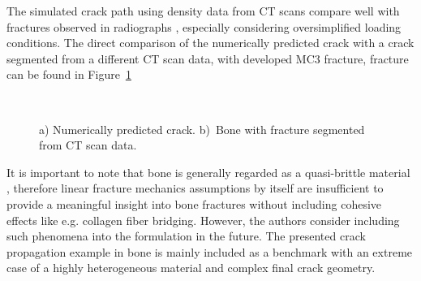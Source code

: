 \documentclass[onecolumn]{svjour3}
\begin{document}
The simulated crack path using density data from CT scans compare well with fractures observed in radiographs \cite{whitton2010third}, especially considering oversimplified loading conditions. The direct comparison of the numerically predicted crack with a crack segmented from a different CT scan data, with developed MC3 fracture, fracture can be found in Figure~\ref{fig:real_fractures}
% 
\begin{figure}
	\centering
	 \\%
	\caption{a) Numerically predicted crack. b)~Bone with fracture segmented from CT scan data. }
\label{fig:real_fractures}
\end{figure}
% 
It is important to note that bone is generally regarded as a quasi-brittle material \cite{gasser2007numerical}, therefore linear fracture mechanics assumptions by itself are insufficient to provide a meaningful insight into bone fractures without including cohesive effects like e.g. collagen fiber bridging. However, the authors consider including such phenomena into the formulation in the future. The presented crack propagation example in bone is mainly included as a benchmark with an extreme case of a highly heterogeneous material and complex final crack geometry. 
% 
\end{document}
